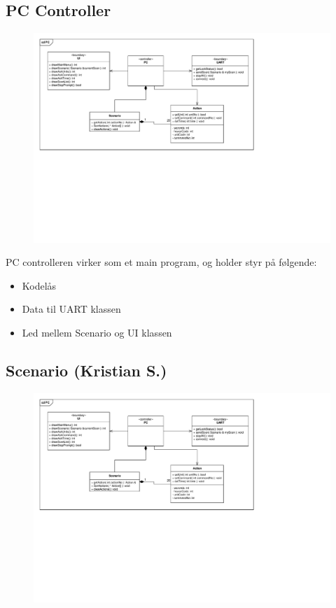 \clearpage

\subsection{PC Controller}

\begin{figure}[h]
\centering
\includegraphics[scale=1,clip=true, trim=267 444 473 60]{Systemarkitektur/diagrammer/PC_KlasseDiagram} %
\end{figure}

PC controlleren virker som et main program, og holder styr på følgende:

\begin{itemize}
\item Kodelås
\item Data til UART klassen
\item Led mellem Scenario og UI klassen
\end{itemize}

\subsection{Scenario (Kristian S.)}

\begin{figure}[h]
\centering
\includegraphics[scale=1,clip=true, trim=149 320 541 224]{../Projektdokumentation/Systemarkitektur/diagrammer/PC_KlasseDiagram.pdf} %
\end{figure}

